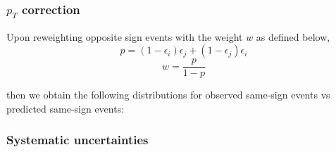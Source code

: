 \FloatBarrier

\subsubsection*{$p_T$ correction}
Upon reweighting opposite sign events with the weight $w$ as defined below,
\begin{equation}
p =(1-\epsilon_i)\epsilon_j + (1-\epsilon_j)\epsilon_i
\end{equation}
\begin{equation}
w = \frac{p}{1-p}
\end{equation}

then we obtain the following distributions for observed same-sign events vs predicted same-sign events: 

\subsubsection*{Systematic uncertainties}
